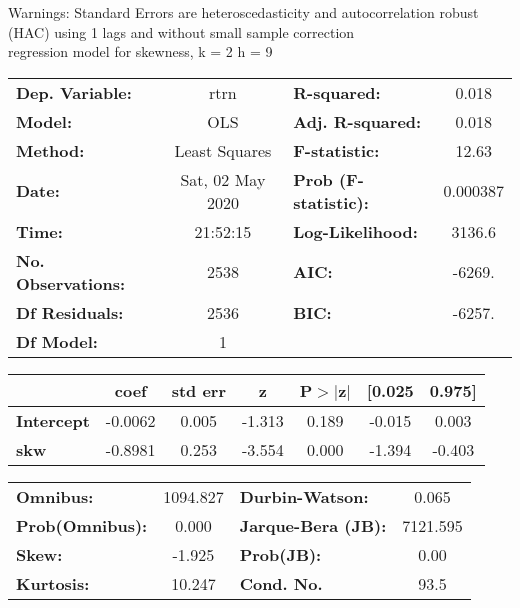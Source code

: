 Warnings: \newline
 [1] Standard Errors are heteroscedasticity and autocorrelation robust (HAC) using 1 lags and without small sample correction\\ 

regression model for skewness, k = 2 h = 9\begin{center}
\begin{tabular}{lclc}
\toprule
\textbf{Dep. Variable:}    &       rtrn       & \textbf{  R-squared:         } &     0.018   \\
\textbf{Model:}            &       OLS        & \textbf{  Adj. R-squared:    } &     0.018   \\
\textbf{Method:}           &  Least Squares   & \textbf{  F-statistic:       } &     12.63   \\
\textbf{Date:}             & Sat, 02 May 2020 & \textbf{  Prob (F-statistic):} &  0.000387   \\
\textbf{Time:}             &     21:52:15     & \textbf{  Log-Likelihood:    } &    3136.6   \\
\textbf{No. Observations:} &        2538      & \textbf{  AIC:               } &    -6269.   \\
\textbf{Df Residuals:}     &        2536      & \textbf{  BIC:               } &    -6257.   \\
\textbf{Df Model:}         &           1      & \textbf{                     } &             \\
\bottomrule
\end{tabular}
\begin{tabular}{lcccccc}
                   & \textbf{coef} & \textbf{std err} & \textbf{z} & \textbf{P$> |$z$|$} & \textbf{[0.025} & \textbf{0.975]}  \\
\midrule
\textbf{Intercept} &      -0.0062  &        0.005     &    -1.313  &         0.189        &       -0.015    &        0.003     \\
\textbf{skw}       &      -0.8981  &        0.253     &    -3.554  &         0.000        &       -1.394    &       -0.403     \\
\bottomrule
\end{tabular}
\begin{tabular}{lclc}
\textbf{Omnibus:}       & 1094.827 & \textbf{  Durbin-Watson:     } &    0.065  \\
\textbf{Prob(Omnibus):} &   0.000  & \textbf{  Jarque-Bera (JB):  } & 7121.595  \\
\textbf{Skew:}          &  -1.925  & \textbf{  Prob(JB):          } &     0.00  \\
\textbf{Kurtosis:}      &  10.247  & \textbf{  Cond. No.          } &     93.5  \\
\bottomrule
\end{tabular}
\end{center}

